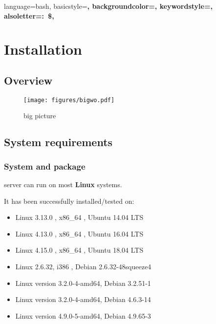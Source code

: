 {language=bash,
basicstyle=\scriptsize\ttfamily\color{white}\bfseries,
backgroundcolor=\color{charcoal},
keywordstyle=\color{white},
alsoletter={:~\$},
}

\chapter{Installation}

\section{Overview}

\begin{figure}[!h]
	\centering
	\texttt{[image: figures/bigwo.pdf]}
	\caption{\webobs big picture}
\end{figure}

\section{System requirements}

\subsection{System and package}

\webobs server can run on most \textbf{Linux} systems.

It has been successfully installed/tested on:
\begin{itemize}
\item   Linux 3.13.0 , x86\_64 , Ubuntu 14.04 LTS
\item   Linux 4.13.0 , x86\_64 , Ubuntu 16.04 LTS
\item   Linux 4.15.0 , x86\_64 , Ubuntu 18.04 LTS
\item   Linux 2.6.32, i386 , Debian 2.6.32-48squeeze4
\item   Linux version 3.2.0-4-amd64, Debian 3.2.51-1
\item   Linux version 3.2.0-4-amd64, Debian 4.6.3-14
\item   Linux version 4.9.0-5-amd64, Debian 4.9.65-3
\end{itemize}

